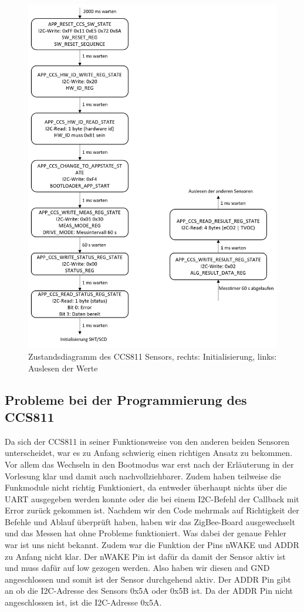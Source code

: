\documentclass[]{article}
\begin{document}
			\begin{figure}[!h]
				\centering
				\includegraphics[scale=0.30]{images/ccs_zustandsdiagramm}
				\caption{Zustandsdiagramm des CCS811 Sensors, rechts: Initialisierung, links: Auslesen der Werte}
				\label{img:ccs_zustandsdiagramm}
			\end{figure}
			\subsection{Probleme bei der Programmierung des CCS811}
				Da sich der CCS811 in seiner Funktionsweise von den anderen beiden Sensoren unterscheidet, war es zu Anfang schwierig einen richtigen Ansatz zu bekommen. Vor allem das Wechseln in den Bootmodus war erst nach der Erläuterung in der Vorlesung klar und damit auch nachvollziehbarer. Zudem haben teilweise die Funkmodule nicht richtig Funktioniert, da entweder überhaupt nichts über die UART ausgegeben werden konnte oder die bei einem I2C-Befehl der Callback mit Error zurück gekommen ist. Nachdem wir den Code mehrmals auf Richtigkeit der Befehle und Ablauf überprüft haben, haben wir das ZigBee-Board ausgewechselt und das Messen hat ohne Probleme funktioniert. Was dabei der genaue Fehler war ist uns nicht bekannt. Zudem war die Funktion der Pins nWAKE und ADDR zu Anfang nicht klar. Der nWAKE Pin ist dafür da damit der Sensor aktiv ist und muss dafür auf low gezogen werden. Also haben wir diesen and GND angeschlossen und somit ist der Sensor durchgehend aktiv. Der ADDR Pin gibt an ob die I2C-Adresse des Sensors 0x5A oder 0x5B ist. Da der ADDR Pin nicht angeschlossen ist, ist die I2C-Adresse 0x5A.
\end{document}
